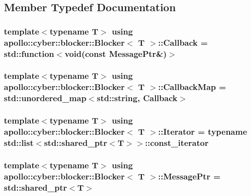 \subsection{Member Typedef Documentation}
\hypertarget{classapollo_1_1cyber_1_1blocker_1_1Blocker_aadf3f89fd884e1d9d2464172ede9213f}{
\subsubsection[{Callback}]{\setlength{\rightskip}{0pt plus 5cm}template$<$typename T$>$ using {\bf apollo\-::cyber\-::blocker\-::\-Blocker}$<$ T $>$\-::{\bf Callback} =  std\-::function$<$void(const {\bf Message\-Ptr}\&)$>$}}\label{classapollo_1_1cyber_1_1blocker_1_1Blocker_aadf3f89fd884e1d9d2464172ede9213f}
\hypertarget{classapollo_1_1cyber_1_1blocker_1_1Blocker_ace3015075930b98718441655315002d5}{
\subsubsection[{Callback\-Map}]{\setlength{\rightskip}{0pt plus 5cm}template$<$typename T$>$ using {\bf apollo\-::cyber\-::blocker\-::\-Blocker}$<$ T $>$\-::{\bf Callback\-Map} =  std\-::unordered\-\_\-map$<$std\-::string, {\bf Callback}$>$}}\label{classapollo_1_1cyber_1_1blocker_1_1Blocker_ace3015075930b98718441655315002d5}
\hypertarget{classapollo_1_1cyber_1_1blocker_1_1Blocker_a62c6fc3bb53c24ed9dd2bc69bdad7e3d}{
\subsubsection[{Iterator}]{\setlength{\rightskip}{0pt plus 5cm}template$<$typename T$>$ using {\bf apollo\-::cyber\-::blocker\-::\-Blocker}$<$ T $>$\-::{\bf Iterator} =  typename std\-::list$<$std\-::shared\-\_\-ptr$<$T$>$$>$\-::const\-\_\-iterator}}\label{classapollo_1_1cyber_1_1blocker_1_1Blocker_a62c6fc3bb53c24ed9dd2bc69bdad7e3d}
\hypertarget{classapollo_1_1cyber_1_1blocker_1_1Blocker_acfdb26545f6e05820e043a22ed91ed1d}{
\subsubsection[{Message\-Ptr}]{\setlength{\rightskip}{0pt plus 5cm}template$<$typename T$>$ using {\bf apollo\-::cyber\-::blocker\-::\-Blocker}$<$ T $>$\-::{\bf Message\-Ptr} =  std\-::shared\-\_\-ptr$<$T$>$}}\label{classapollo_1_1cyber_1_1blocker_1_1Blocker_acfdb26545f6e05820e043a22ed91ed1d}
